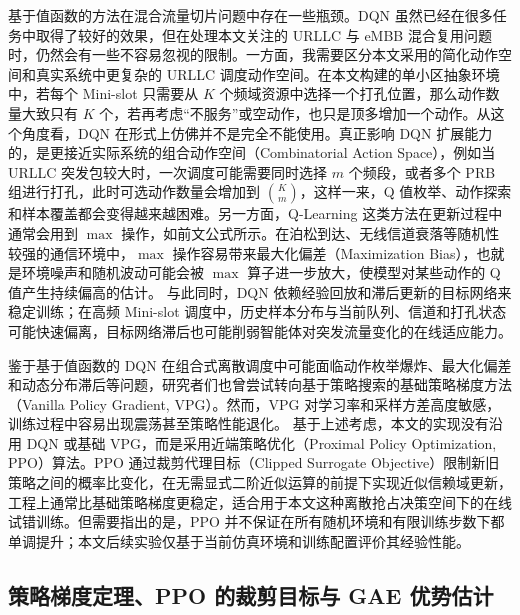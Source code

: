 基于值函数的方法在混合流量切片问题中存在一些瓶颈。DQN 虽然已经在很多任务中取得了较好的效果，但在处理本文关注的 URLLC 与 eMBB 混合复用问题时，仍然会有一些不容易忽视的限制。一方面，我需要区分本文采用的简化动作空间和真实系统中更复杂的 URLLC 调度动作空间。在本文构建的单小区抽象环境中，若每个 Mini-slot 只需要从 $K$ 个频域资源中选择一个打孔位置，那么动作数量大致只有 $K$ 个，若再考虑“不服务”或空动作，也只是顶多增加一个动作。从这个角度看，DQN 在形式上仿佛并不是完全不能使用。真正影响 DQN 扩展能力的，是更接近实际系统的组合动作空间（Combinatorial Action Space），例如当 URLLC 突发包较大时，一次调度可能需要同时选择 $m$ 个频段，或者多个 PRB 组进行打孔，此时可选动作数量会增加到 $\binom{K}{m}$，这样一来，Q 值枚举、动作探索和样本覆盖都会变得越来越困难。另一方面，Q-Learning 这类方法在更新过程中通常会用到 $\max$ 操作，如前文公式所示。在泊松到达、无线信道衰落等随机性较强的通信环境中，$\max$ 操作容易带来最大化偏差（Maximization Bias），也就是环境噪声和随机波动可能会被 $\max$ 算子进一步放大，使模型对某些动作的 Q 值产生持续偏高的估计。
与此同时，DQN 依赖经验回放和滞后更新的目标网络来稳定训练；在高频 Mini-slot 调度中，历史样本分布与当前队列、信道和打孔状态可能快速偏离，目标网络滞后也可能削弱智能体对突发流量变化的在线适应能力。

鉴于基于值函数的 DQN 在组合式离散调度中可能面临动作枚举爆炸、最大化偏差和动态分布滞后等问题，研究者们也曾尝试转向基于策略搜索的基础策略梯度方法（Vanilla Policy Gradient, VPG）。然而，VPG 对学习率和采样方差高度敏感，训练过程中容易出现震荡甚至策略性能退化。
基于上述考虑，本文的实现没有沿用 DQN 或基础 VPG，而是采用近端策略优化（Proximal Policy Optimization, PPO）算法。PPO 通过裁剪代理目标（Clipped Surrogate Objective）限制新旧策略之间的概率比变化，在无需显式二阶近似运算的前提下实现近似信赖域更新，工程上通常比基础策略梯度更稳定，适合用于本文这种离散抢占决策空间下的在线试错训练。但需要指出的是，PPO 并不保证在所有随机环境和有限训练步数下都单调提升；本文后续实验仅基于当前仿真环境和训练配置评价其经验性能。









\subsection{策略梯度定理、PPO 的裁剪目标与 GAE 优势估计}\label{223-ux7b56ux7565ux68afux5ea6ux5b9aux7406ppo-ux7684ux88c1ux526aux76eeux6807ux4e0e-gae-ux4f18ux52bfux4f30ux8ba1}

